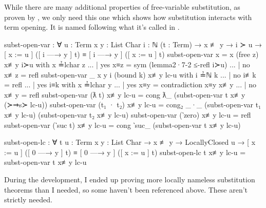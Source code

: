 While there are many additional properties of free-variable substitution, as proven by
\citet{chargueraud_locally_2012}, we only need this one which shows how substitution interacts with
term opening. It is named following what it's called in \citet{chargueraud_locally_2012}.
\begin{code}
  subst-open-var : ∀ {u : Term} {x y : List Char} {i : ℕ} (t : Term)
    → x ≢ y
    → i ≻ u
    → [ x := u ] ([ i —→ y ] t) ≡ [ i —→ y ] ([ x := u ] t)
  subst-open-var {x = x} (free z) x≢y i≻u with x ≟lchar z
  ... | yes x≡z = sym (lemma2·7-2 ≤-refl i≻u)
  ... | no  x≢z = refl
  subst-open-var {_} {x} {y} {i} (bound k) x≢y lc-u with i ≟ℕ k
  ... | no  i≢k = refl
  ... | yes i≡k with x ≟lchar y
  ...   | yes x≡y = contradiction x≡y x≢y
  ...   | no  x≢y = refl
  subst-open-var (ƛ t) x≢y lc-u =
    cong ƛ_ (subst-open-var t x≢y (≻⇒s≻ lc-u))
  subst-open-var (t₁ · t₂) x≢y lc-u =
    cong₂ _·_
      (subst-open-var t₁ x≢y lc-u)
      (subst-open-var t₂ x≢y lc-u)
  subst-open-var (‵zero) x≢y lc-u = refl
  subst-open-var (‵suc t) x≢y lc-u =
    cong ‵suc_ (subst-open-var t x≢y lc-u)

  subst-open-lc : ∀ {t u : Term} {x y : List Char}
    → x ≢ y
    → LocallyClosed u
    → [ x := u ] ([ 0 —→ y ] t) ≡ [ 0 —→ y ] ([ x := u ] t)
  subst-open-lc {t} x≢y lc-u = subst-open-var t x≢y lc-u
\end{code}

During the development, I ended up proving more locally nameless substitution theorems than I
needed, so some haven't been referenced above. These aren't strictly needed.

